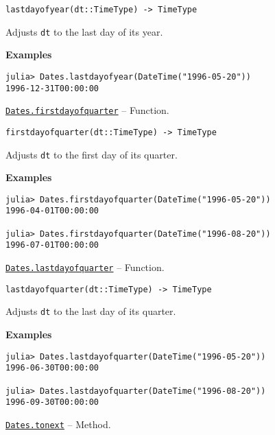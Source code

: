 \begin{adjustwidth}{2em}{0pt}


\begin{verbatim}
lastdayofyear(dt::TimeType) -> TimeType
\end{verbatim}

Adjusts \texttt{dt} to the last day of its year.

\textbf{Examples}


\begin{verbatim}
julia> Dates.lastdayofyear(DateTime("1996-05-20"))
1996-12-31T00:00:00
\end{verbatim}



\end{adjustwidth}
\hypertarget{16102783699720368943}{} 
\hyperlink{16102783699720368943}{\texttt{Dates.firstdayofquarter}}  -- {Function.}

\begin{adjustwidth}{2em}{0pt}


\begin{verbatim}
firstdayofquarter(dt::TimeType) -> TimeType
\end{verbatim}

Adjusts \texttt{dt} to the first day of its quarter.

\textbf{Examples}


\begin{verbatim}
julia> Dates.firstdayofquarter(DateTime("1996-05-20"))
1996-04-01T00:00:00

julia> Dates.firstdayofquarter(DateTime("1996-08-20"))
1996-07-01T00:00:00
\end{verbatim}



\end{adjustwidth}
\hypertarget{90261086996796964}{} 
\hyperlink{90261086996796964}{\texttt{Dates.lastdayofquarter}}  -- {Function.}

\begin{adjustwidth}{2em}{0pt}


\begin{verbatim}
lastdayofquarter(dt::TimeType) -> TimeType
\end{verbatim}

Adjusts \texttt{dt} to the last day of its quarter.

\textbf{Examples}


\begin{verbatim}
julia> Dates.lastdayofquarter(DateTime("1996-05-20"))
1996-06-30T00:00:00

julia> Dates.lastdayofquarter(DateTime("1996-08-20"))
1996-09-30T00:00:00
\end{verbatim}



\end{adjustwidth}
\hypertarget{9410879287453023176}{} 
\hyperlink{9410879287453023176}{\texttt{Dates.tonext}}  -- {Method.}

